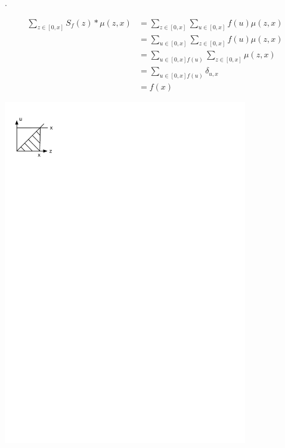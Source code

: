 \Proof.
\begin{minipage}[t]{0.6\textwidth}
  \begin{align*}
      \sum_{z \in [0,x]} S_f(z) * \mu(z,x)
      &= \sum_{z \in [0,x]} \sum_{u \in [0,x]} f(u) \mu(z,x) \\
      &= \sum_{u \in [0,x]} \sum_{z \in [0,x]} f(u) \mu(z,x) \\
      &= \sum_{u \in [0,x] f(u)} \sum_{z \in [0,x]} \mu(z,x) \\
      &= \sum_{u \in [0,x] f(u)} \delta_{u,x} \\
      &= f(x)
  \end{align*}
\end{minipage}
\begin{minipage}[t]{0.3\textwidth}
  \vspace{1.2cm}
  \begin{center}
    \includegraphics[width=0.8\textwidth]
      {02_higher_combinatorics/pics/MoebiusSum}
  \end{center}
\end{minipage}
